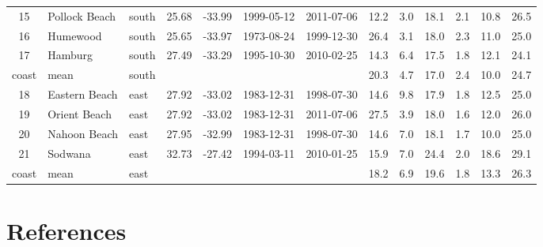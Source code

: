 \documentclass[a4paper,10pt,review]{elsarticle}
\begin{document}
\begin{table}[]
\begin{tabular}{cllcccccccccc}
15 & Pollock Beach & south & 25.68 & -33.99 & 1999-05-12 & 2011-07-06 & 12.2 & 3.0 & 18.1 & 2.1 & 10.8 & 26.5 \\ 
16 & Humewood & south & 25.65 & -33.97 & 1973-08-24 & 1999-12-30 & 26.4 & 3.1 & 18.0 & 2.3 & 11.0 & 25.0 \\ 
17 & Hamburg & south & 27.49 & -33.29 & 1995-10-30 & 2010-02-25 & 14.3 & 6.4 & 17.5 & 1.8 & 12.1 & 24.1 \\ 
coast & mean & south &  &  &  &  & 20.3 & 4.7 & 17.0 & 2.4 & 10.0 & 24.7 \\ 
18 & Eastern Beach & east & 27.92 & -33.02 & 1983-12-31 & 1998-07-30 & 14.6 & 9.8 & 17.9 & 1.8 & 12.5 & 25.0 \\ 
19 & Orient Beach & east & 27.92 & -33.02 & 1983-12-31 & 2011-07-06 & 27.5 & 3.9 & 18.0 & 1.6 & 12.0 & 26.0 \\ 
20 & Nahoon Beach & east & 27.95 & -32.99 & 1983-12-31 & 1998-07-30 & 14.6 & 7.0 & 18.1 & 1.7 & 10.0 & 25.0 \\ 
21 & Sodwana & east & 32.73 & -27.42 & 1994-03-11 & 2010-01-25 & 15.9 & 7.0 & 24.4 & 2.0 & 18.6 & 29.1 \\ 
coast & mean & east &  &  &  &  & 18.2 & 6.9 & 19.6 & 1.8 & 13.3 & 26.3 \\ 
   \hline
\end{tabular}
\end{table}

\section*{References}


\end{document}
